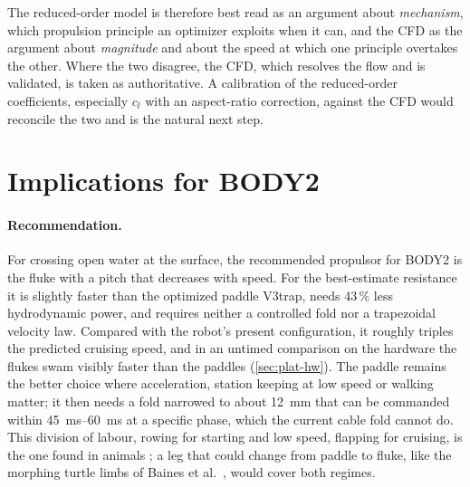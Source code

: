 The reduced-order model is therefore best read as an argument about \emph{mechanism}, which propulsion principle an
optimizer exploits when it can, and the CFD as the argument about \emph{magnitude} and about the speed at which one
principle overtakes the other. Where the two disagree, the CFD, which resolves the flow and is validated, is taken as
authoritative. A calibration of the reduced-order coefficients, especially $c_l$ with an aspect-ratio correction, against
the CFD would reconcile the two and is the natural next step.

\section{Implications for BODY2}
\label{sec:disc-design}
\label{sec:disc-limits-prop}

\paragraph{Recommendation.} For crossing open water at the surface, the recommended propulsor for BODY2 is the fluke with a pitch
that decreases with speed. For the best-estimate resistance it is slightly faster than the optimized paddle V3trap, needs 43\,\% less
hydrodynamic power, and requires neither a controlled fold nor a trapezoidal velocity law. Compared with the robot's present
configuration, it roughly triples the predicted cruising speed, and in an untimed comparison on the hardware the flukes swam visibly faster than the paddles
(\cref{sec:plat-hw}). The
paddle remains the better choice where acceleration, station keeping at low speed or walking matter; it then needs a fold narrowed to
about \SI{12}{\milli\metre} that can be commanded within \SIrange{45}{60}{\milli\second} at a specific phase, which the current cable
fold cannot do. This division of labour, rowing for starting and low speed, flapping for cruising, is the one found in animals
\cite{Walker2000,Fish1996}; a leg that could change from paddle to fluke, like the morphing turtle limbs of Baines et
al.\ \cite{Baines2022}, would cover both regimes.

